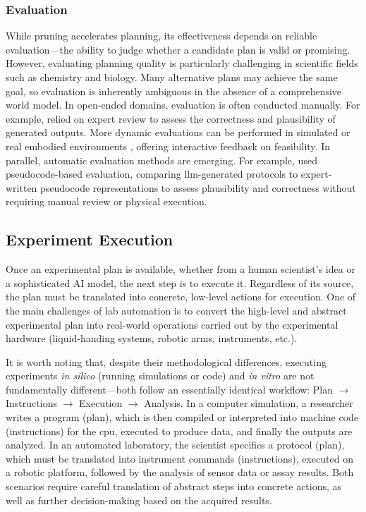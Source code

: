 \subsubsection{Evaluation}
While pruning accelerates planning, its effectiveness depends on reliable evaluation---the ability to judge whether a candidate plan is valid or promising. 
However, evaluating planning quality is particularly challenging in scientific fields such as chemistry and biology. 
Many alternative plans may achieve the same goal, so evaluation is inherently ambiguous in the absence of a comprehensive world model.
In open-ended domains, evaluation is often conducted manually. 
For example,  \autocite{bran2024augmenting} relied on expert review to assess the correctness and plausibility of generated outputs. 
More dynamic evaluations can be performed in simulated or real embodied environments \autocite{song2023llm, choi2024lota}, offering interactive feedback on feasibility. 
In parallel, automatic evaluation methods are emerging. 
For example, \autocite{o2023bioplanner}
used pseudocode-based evaluation, comparing \gls{llm}-generated protocols to expert-written pseudocode representations to assess plausibility and correctness without requiring manual review or physical execution.


\subsection{Experiment Execution}
Once an experimental plan is available, whether from a human scientist's idea or a sophisticated AI model, the next step is to execute it. 
Regardless of its source, the plan must be translated into concrete, low-level actions for execution. One of the main challenges of lab automation is to convert the high-level and abstract experimental plan into real-world operations carried out by the experimental hardware (liquid-handing systems, robotic arms, instruments, etc.). 

It is worth noting that, despite their methodological differences, executing experiments \textit{in silico} (running simulations or code) and \textit{in vitro} are not fundamentally different---both follow an essentially identical workflow: Plan $\rightarrow$ Instructions $\rightarrow$ Execution $\rightarrow$ Analysis. 
In a computer simulation, a researcher writes a program (plan), which is then compiled or interpreted into machine code (instructions) for the \gls{cpu}, executed to produce data, and finally the outputs are analyzed. 
In an automated laboratory, the scientist specifies a protocol (plan), which must be translated into instrument commands (instructions), executed on a robotic platform, followed by the analysis of sensor data or assay results. Both scenarios require careful translation of abstract steps into concrete actions, as well as further decision-making based on the acquired results.

